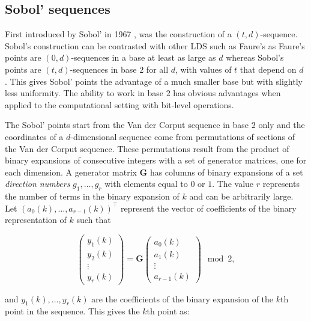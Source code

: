 \subsection{Sobol' sequences} \label{sec:SobolSequences}
First introduced by Sobol' in 1967 \cite{sobol1967distribution}, was the construction of a $(t,d)$-sequence. Sobol's construction can be contrasted with other LDS such as Faure's \cite{Faure1982} as Faure's points are $(0,d)$-sequences in a base at least as large as $d$ whereas Sobol's points are $(t,d)$-sequences in base $2$ for all $d$, with values of $t$ that depend on $d$ \cite{glasserman2004monte}. This gives Sobol' points the advantage of a much smaller base but with slightly less uniformity. The ability to work in base $2$ has obvious advantages when applied to the computational setting with bit-level operations.

The Sobol' points start from the Van der Corput sequence in base $2$ only and the coordinates of a $d$-dimensional sequence come from permutations of sections of the Van der Corput sequence. These permutations result from the product of binary expansions of consecutive integers with a set of generator matrices, one for each dimension. A generator matrix $\boldsymbol{G}$ has columns of binary expansions of a set \textit{direction numbers} $g_1,\dots,g_r$ with elements equal to $0$ or $1$. The value $r$ represents the number of terms in the binary expansion of $k$ and can be arbitrarily large. Let $(a_0(k),\dots,a_{r-1}(k))^\top$ represent the vector of coefficients of the binary representation of $k$ such that

\begin{equation} \label{eqn:GeneratorMatrixExpression}
    \begin{pmatrix}
    y_1(k) \\
    y_2(k) \\
    \vdots \\
    y_r(k)
    \end{pmatrix}
    = \boldsymbol{G} 
    \begin{pmatrix}
    a_0(k) \\
    a_1(k) \\
    \vdots \\
    a_{r-1}(k)
    \end{pmatrix}
    \mod{2},
\end{equation}

and $y_1(k),\dots,y_r(k)$ are the coefficients of the binary expansion of the $k$th point in the sequence. This gives the $k$th point as:

